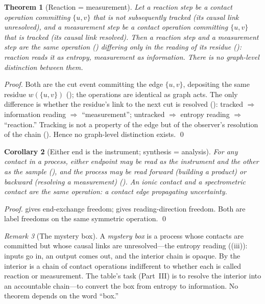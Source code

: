 \documentclass[11pt,twocolumn,a4paper]{article}
\theoremstyle{thmstyle}
\newtheorem{theorem}{Theorem}[section]
\newtheorem{corollary}[theorem]{Corollary}
\theoremstyle{definition}
\theoremstyle{remark}
\newtheorem{remark}[theorem]{Remark}
\newcommand{\wt}{w}
\begin{document}
\begin{theorem}[Reaction = measurement]
\label{thm:reaction-measurement}
Let a \emph{reaction step} be a contact operation committing $\{u,v\}$ that
is not subsequently tracked (its causal link unresolved), and a
\emph{measurement step} be a contact operation committing $\{u,v\}$ that is
tracked (its causal link resolved). Then a reaction step and a measurement
step are the same operation () differing only in the
reading of its residue (): reaction reads it as
entropy, measurement as information. There is no graph-level distinction
between them.
\end{theorem}

\begin{proof}
Both are the cut event committing the edge $\{u,v\}$, depositing the same
residue $\wt(\{u,v\})$ (); the operations are
identical as graph acts. The only difference is whether the residue's link
to the next cut is resolved (): tracked
$\Rightarrow$ information reading $\Rightarrow$ ``measurement''; untracked
$\Rightarrow$ entropy reading $\Rightarrow$ ``reaction.'' Tracking is not a
property of the edge but of the observer's resolution of the chain
(). Hence no graph-level distinction exists. \qed
\end{proof}

\begin{corollary}[Either end is the instrument; synthesis = analysis]
\label{cor:either-end}
For any contact in a process, either endpoint may be read as the
instrument and the other as the sample (), and the
process may be read forward (building a product) or backward (resolving a
measurement) (). An ionic contact and a
spectrometric contact are the same operation: a contact edge propagating
uncertainty.
\end{corollary}

\begin{proof}
 gives end-exchange freedom;
 gives reading-direction freedom. Both are
label freedoms on the same symmetric operation. \qed
\end{proof}

\begin{remark}[The mystery box]
\label{rem:box}
A \emph{mystery box} is a process whose contacts are committed but whose
causal links are unresolved---the entropy reading
((iii)): inputs go in, an output comes out, and
the interior chain is opaque. By  the
interior is a chain of contact operations indifferent to whether each is
called reaction or measurement. The table's task (Part~III) is to resolve
the interior into an accountable chain---to convert the box from entropy to
information. No theorem depends on the word ``box.''
\end{remark}
\end{document}
